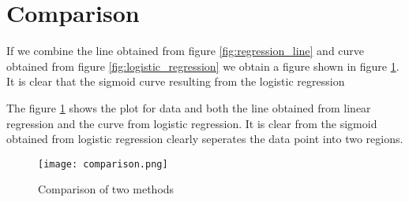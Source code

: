 \section{Comparison}

If we combine the line obtained from figure \ref{fig:regression_line} and curve obtained
from figure \ref{fig:logistic_regression} we obtain a figure shown in figure \ref{fig:comparison}. It is clear that the 
sigmoid curve resulting from the logistic regression

The figure \ref{fig:comparison} shows the plot for data and both the line obtained from
linear regression and the curve from logistic regression. It is clear from the sigmoid obtained from logistic regression
clearly seperates the data point into two regions.

\begin{figure}[!ht]
  \texttt{[image: comparison.png]}
  \caption{Comparison of two methods}
  \label{fig:comparison}
\end{figure}

